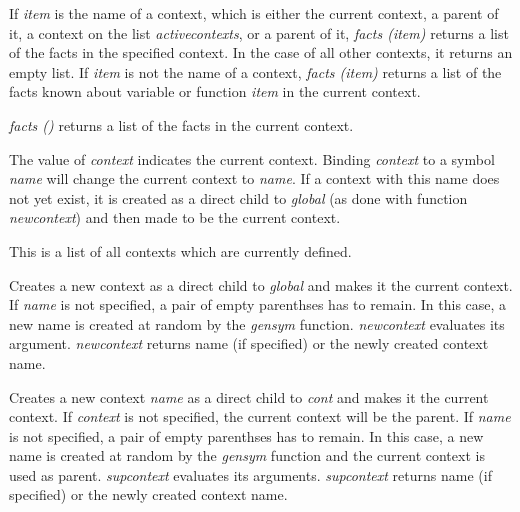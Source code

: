 \documentclass[../Maxima_Workbook.tex]{subfiles}
\begin{document}

\lz If \emph{item} is the name of a context, which is either the current context, a parent of it, a context on the list \emph{activecontexts}, or a parent of it, \emph{facts (item)} returns a list of the facts in the specified context. In the case of all other contexts, it returns an empty list. If \emph{item} is not the name of a context, \emph{facts (item)} returns a list of the facts known about variable or function \emph{item} in the current context. 

\lz \emph{facts ()} returns a list of the facts in the current context.

\lzz \hypertarget{context}{} \qquad {}

\lz The value of \emph{context} indicates the current context. Binding \emph{context} to a symbol \emph{name} will change the current context to \emph{name}. If a context with this name does not yet exist, it is created as a direct child to \emph{global} (as done with function \emph{newcontext}) and then made to be the current context.

\lzz \hypertarget{contexts}{} \qquad {}

\lz This is a list of all contexts which are currently defined.

\lzz \hypertarget{newcontext}{\emph{}} \hfill \tcr{[function]}

\lz Creates a new context as a direct child to \emph{global} and makes it the current context. If \emph{name} is not specified, a pair of empty parenthses has to remain. In this case, a new name is created at random by the \emph{gensym} function. \emph{newcontext} evaluates its argument. \emph{newcontext} returns name (if specified) or the
newly created context name.

\lzz \hypertarget{supcontext}{} \hfill \tcr{[function]}

\lz Creates a new context \emph{name} as a direct child to \emph{cont} and makes it the current context. If \emph{context} is not specified, the current context will be the parent. If \emph{name} is not specified, a pair of empty parenthses has to remain. In this case, a new name is created at random by the \emph{gensym} function and the current context is used as parent. \emph{supcontext} evaluates its arguments. \emph{supcontext} returns name (if specified) or the newly created context name.
\end{document}
